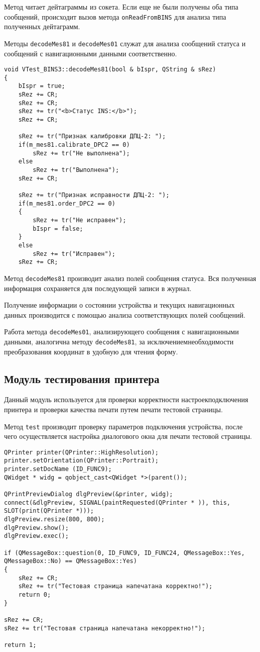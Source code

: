 Метод читает дейтаграммы из сокета. Если еще не были получены оба типа сообщений, происходит вызов метода
\texttt{onReadFromBINS} для анализа типа полученных дейтаграмм.

Методы \texttt{decodeMes81} и \texttt{decodeMes01} служат для анализа сообщений статуса и сообщений с навигационными
данными соответственно.
\medskip
\begin{verbatim}
void VTest_BINS3::decodeMes81(bool & bIspr, QString & sRez)
{
	bIspr = true;
	sRez += CR;
	sRez += CR;
	sRez += tr("<b>Статус INS:</b>");
	sRez += CR;

	sRez += tr("Признак калибровки ДПЦ-2: ");
	if(m_mes81.calibrate_DPC2 == 0)
		sRez += tr("Не выполнена");
	else
		sRez += tr("Выполнена");
	sRez += CR;

	sRez += tr("Признак исправности ДПЦ-2: ");
	if(m_mes81.order_DPC2 == 0)
	{
		sRez += tr("Не исправен");
		bIspr = false;
	}
	else
		sRez += tr("Исправен");
	sRez += CR;
\end{verbatim}
\medskip

Метод \texttt{decodeMes81} производит анализ полей сообщения статуса. Вся полученная информация сохраняется для
последующей записи в журнал.

Получение информации о состоянии устройства и текущих навигационных данных производится с помощью анализа соответствующих
полей сообщений.

Работа метода \texttt{decodeMes01}, анализирующего сообщения с навигационными данными, аналогична методу
\texttt{decodeMes81}, за исключением\break необходимости преобразования координат в удобную для чтения форму.

\subsection{Модуль тестирования принтера}
Данный модуль используется для проверки корректности настроек\break подключения принтера и проверки качества печати путем
печати тестовой страницы.

Метод \texttt{test} производит проверку параметров подключения устройства, после чего осуществляется настройка
диалогового окна для печати тестовой страницы.
\medskip
\begin{verbatim}
QPrinter printer(QPrinter::HighResolution);
printer.setOrientation(QPrinter::Portrait);
printer.setDocName (ID_FUNC9);
QWidget * widg = qobject_cast<QWidget *>(parent());

QPrintPreviewDialog dlgPreview(&printer, widg);
connect(&dlgPreview, SIGNAL(paintRequested(QPrinter * )), this, SLOT(print(QPrinter *)));
dlgPreview.resize(800, 800);
dlgPreview.show();
dlgPreview.exec();

if (QMessageBox::question(0, ID_FUNC9, ID_FUNC24, QMessageBox::Yes, QMessageBox::No) == QMessageBox::Yes)
{
	sRez += CR;
	sRez += tr("Тестовая страница напечатана корректно!");
	return 0;
}

sRez += CR;
sRez += tr("Тестовая страница напечатана некорректно!");

return 1;
\end{verbatim}
\medskip

